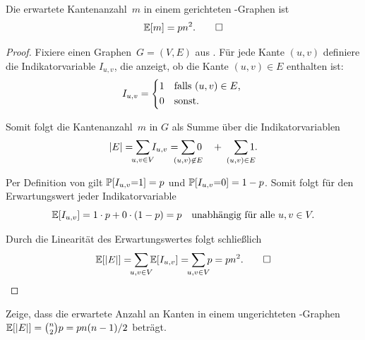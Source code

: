 \begin{lemma}\label{lemma:erwartete_kanten_in_gnp}
    Die  erwartete Kantenanzahl~$m$ in einem gerichteten \Gnp-Graphen ist \begin{equation*} \mathbb{E}\!\left[m\right] = p n^2. \qedhere \end{equation*}
\end{lemma}

\begin{proof}
    Fixiere einen Graphen~$G=(V,E)$ aus \Gnp.
    Für jede Kante $(u,v)$ definiere die Indikatorvariable $I_{u,v}$, die anzeigt, ob die Kante $(u,v) \in E$ enthalten ist:
    \begin{equation}
        I_{u,v} = \begin{cases*}
            1 & falls $(u,v) \in E$, \\
            0 & sonst.
        \end{cases*}
    \end{equation}

    \noindent Somit folgt die Kantenanzahl~$m$ in $G$ als Summe über die Indikatorvariablen
    \begin{equation}
        |E| = \smashoperator{\sum_{u,v \in V}} I_{u,v} = \smashoperator{\sum_{(u,v) \not\in E}} 0 \quad + \quad \smashoperator{\sum_{(u,v) \in E}} 1.
    \end{equation}

    \noindent Per Definition von \Gnp gilt $\mathbb{P}\!\left[I_{u,v} {=} 1\right] = p$ und $\mathbb{P}\!\left[I_{u,v} {=} 0\right] = 1-p$.
    Somit folgt für den Erwartungswert jeder Indikatorvariable
    \begin{equation}
        \mathbb{E}\!\left[I_{u,v}\right] = 1 \cdot p + 0 \cdot (1-p) = p \quad \text{unabhängig für alle } u, v \in V.
    \end{equation}

    \noindent Durch die Linearität des Erwartungswertes folgt schließlich
    \begin{equation}
        \expv{|E|} = \smashoperator{\sum_{u,v \in V}} \expv{I_{u,v}} = \smashoperator{\sum_{u,v \in V}} p = p n^2. \qedhere
    \end{equation}
\end{proof}

\begin{exercise}
    Zeige, dass die erwartete Anzahl an Kanten in einem ungerichteten \Gnp-Graphen $\mathbb{E}\!\left[|E|\right] = \binom{n}{2} p = p n(n-1)/2$ beträgt.
\end{exercise}

